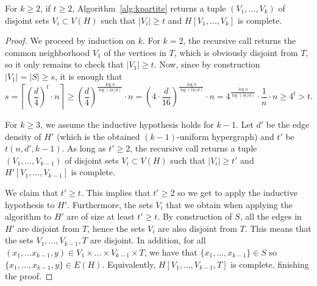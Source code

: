 \begin{theorem}
    For $k \geq 2$, if $t \geq 2$, Algorithm~\ref{alg:kpartite} returns a tuple $(V_1, \dots, V_k)$ of disjoint sets $V_i \subset V(H)$ such that
    $|V_i| \geq t$ and $H[V_1, \dots, V_k]$ is complete.

    \begin{proof}
        We proceed by induction on $k$.
        For $k=2$, the recursive call returns the common neighborhood $V_1$ of the vertices in $T$,
        which is obviously disjoint from $T$, so it only remains to check that $|V_1| \geq t$.
        Now, since by construction $|V_1| = |S| \geq s$, it is enough that
        \[
            s
            = \left\lceil \left( \frac{d}{4}\right)^t \cdot n\right\rceil
            \geq \left( \frac{d}{4}\right)^{\frac{\log n}{\log(16/d)}}  \cdot n
            = \left( 4 \cdot \frac{d}{16}\right)^{\frac{\log n}{\log(16/d)}} \cdot n
            = 4^{\frac{\log n}{\log(16/d)}} \cdot \frac{1}{n} \cdot n
            \geq 4^t
            > t.
        \]

        For $k \geq 3$, we assume the inductive hypothesis holds for $k-1$.
        Let $d'$ be the edge density of $H'$ (which is the obtained $(k-1)$-uniform hypergraph)
        and $t'$ be $t(n, d', k-1)$.
        As long as $t' \geq 2$, the recursive call returns
        a tuple $(V_1, \dots, V_{k-1})$ of disjoint sets $V_i \subset V(H)$ such that
        $|V_i| \geq t'$ and $H'[V_1, \dots, V_{k-1}]$ is complete.

        We claim that $t' \geq t$.
        This implies that $t' \geq 2$ so we get to apply the inductive hypothesis to $H'$.
        Furthermore, the sets $V_i$ that we obtain when applying the algorithm to $H'$
        are of size at least $t' \geq t$.
        By construction of $S$, all the edges in $H'$ are disjoint from $T$,
        hence the sets $V_i$ are also disjoint from $T$.
        This means that the sets $V_1, \dots, V_{k-1}, T$ are disjoint.
        In addition, for all $(x_1, \dots x_{k-1}, y) \in V_1 \times \dots \times V_{k-1} \times T$,
        we have that $\{x_1, \dots, x_{k-1}\} \in S$ so $\{x_1, \dots, x_{k-1}, y\} \in E(H)$.
        Equivalently, $H[V_1, \dots, V_{k-1}, T]$ is complete, finishing the proof.


\end{proof}
\end{theorem}
